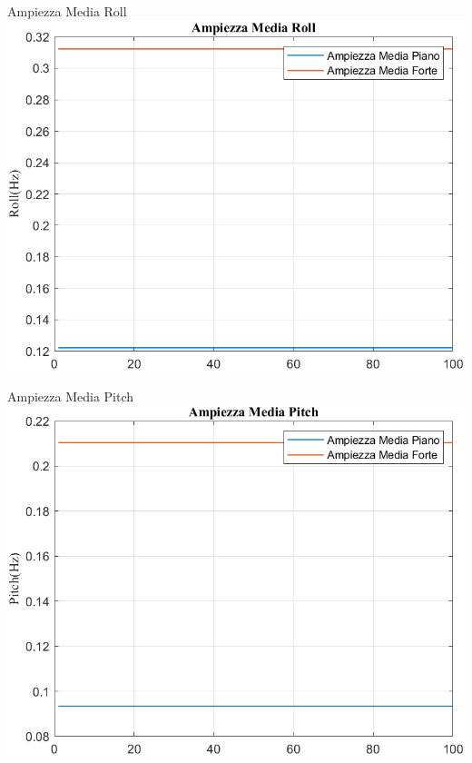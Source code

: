 \documentclass[beamer]{standalone}
\begin{document}
	\begin{frame}{{Ampiezza Media Roll}}					
		\centering\includegraphics[height=.8\textheight]{figure/VAng/Trasformata/Ampiezza MediaRoll}
	\end{frame}
	
	\begin{frame}{{Ampiezza Media Pitch}}					
		\centering\includegraphics[height=.8\textheight]{figure/VAng/Trasformata/Ampiezza MediaPitch}
	\end{frame}
	
\end{document}
